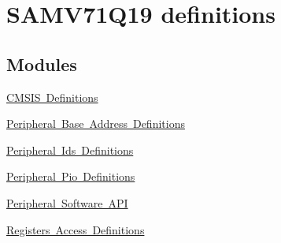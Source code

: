 \hypertarget{group__SAMV71Q19__definitions}{}\section{S\+A\+M\+V71\+Q19 definitions}
\label{group__SAMV71Q19__definitions}
\subsection*{Modules}
\begin{DoxyCompactItemize}
\item 
\mbox{\hyperlink{group__SAMV71Q19__cmsis}{C\+M\+S\+I\+S Definitions}}
\item 
\mbox{\hyperlink{group__SAMV71Q19__base}{Peripheral Base Address Definitions}}
\item 
\mbox{\hyperlink{group__SAMV71Q19__id}{Peripheral Ids Definitions}}
\item 
\mbox{\hyperlink{group__SAMV71Q19__pio}{Peripheral Pio Definitions}}
\item 
\mbox{\hyperlink{group__SAMV71Q19__api}{Peripheral Software A\+PI}}
\item 
\mbox{\hyperlink{group__SAMV71Q19__reg}{Registers Access Definitions}}
\end{DoxyCompactItemize}
